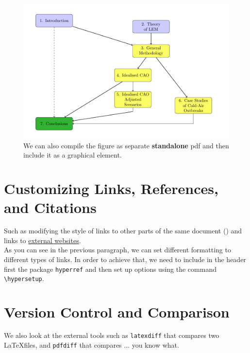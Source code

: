 \documentclass[a4paper,10pt]{report} %
\begin{document}
   \begin{figure}[!ht]
    \includegraphics[width=\textwidth]{./latex/standalone.pdf}
        \caption[Diagrams and plots]{We can also compile the figure as separate \textbf{standalone}  pdf and then include it as a graphical element. }  
      \label{fig:standalone}
 \end{figure}

 \newpage 
 
 \section{Customizing Links, References, and Citations}
 Such as modifying the style of links to other parts of the same document () and links to \href{https://geomet.uni-koeln.de/en/}{external websites}.\\
 
 As you can see in the previous paragraph, we can set different formatting to different types of links. In order to achieve that, we need to include in the header first the package \texttt{hyperref} and then set up options using the command
 \texttt{\textbackslash hypersetup}.\\
 
 
 \section{Version Control and Comparison}
 We also look at the external tools such as \texttt{latexdiff} that compares two \LaTeX files, and  \texttt{pdfdiff} that compares \( \ldots \) you know what.  
  
\end{document}
